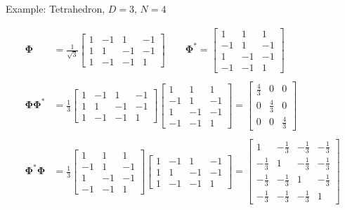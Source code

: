 \documentclass[12pt]{beamer}
\newcommand{\bfPhi}{\boldsymbol{\Phi}}
\begin{document}
\begin{frame}{Example: Tetrahedron, $D=3$, $N=4$}

\begin{align*}
\bfPhi
&=\tfrac{1}{\sqrt{3}}\left[\begin{array}{rrrr}
 1&-1& 1&-1\\
 1& 1&-1&-1\\
 1&-1&-1& 1
\end{array}\right] \qquad 
\bfPhi^*=\left[\begin{array}{rrr}
 1& 1& 1\\
-1& 1&-1\\
 1&-1&-1\\
-1&-1& 1
\end{array}\right]\\\\
\bfPhi\bfPhi^*
&=\tfrac{1}{3}\left[\begin{array}{rrrr}
 1&-1& 1&-1\\
 1& 1&-1&-1\\
 1&-1&-1& 1
\end{array}\right]
\left[\begin{array}{rrr}
 1& 1& 1\\
-1& 1&-1\\
 1&-1&-1\\
-1&-1& 1
\end{array}\right]
=\left[\begin{array}{rrrr}
\tfrac{4}{3}&0&0\\
0&\tfrac{4}{3}&0\\
0&0&\tfrac{4}{3}
\end{array}\right]\\\\
\bfPhi^*\bfPhi
&=\tfrac{1}{3}\left[\begin{array}{rrr}
 1& 1& 1\\
-1& 1&-1\\
 1&-1&-1\\
-1&-1& 1
\end{array}\right]
\left[\begin{array}{rrrr}
 1&-1& 1&-1\\
 1& 1&-1&-1\\
 1&-1&-1& 1
\end{array}\right]
=\left[\begin{array}{rrrr}
 1&-\tfrac{1}{3}&-\tfrac{1}{3}&-\tfrac{1}{3}\\
-\tfrac{1}{3}& 1&-\tfrac{1}{3}&-\tfrac{1}{3}\\
-\tfrac{1}{3}&-\tfrac{1}{3}& 1&-\tfrac{1}{3}\\
-\tfrac{1}{3}&-\tfrac{1}{3}&-\tfrac{1}{3}& 1
\end{array}\right]
\end{align*}
\end{frame}
\end{document}
